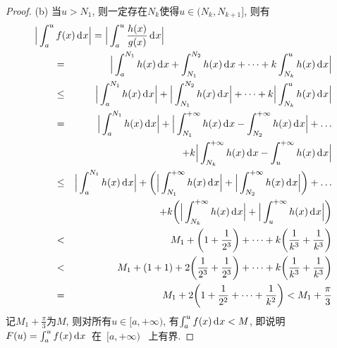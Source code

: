\documentclass[a4paper,12pt,twoside]{ctexart}
\begin{document}
\begin{proof}
    (b) 当$u>N_1$, 则一定存在${N_k}$使得$u\in(N_k, N_{k+1}]$, 则有\setcolsep
\begin{eqnarray*}
    \lefteqn{\Big\vert\int_a^uf(x)\dx\Big\vert
    =\Big\vert\int_{a}^{u}\frac{h(x)}{g(x)}\dx\Big\vert}\qquad\\
    &=&\Big\vert\int_{a}^{N_1}h(x)\dx+ \int_{N_1}^{N_2}h(x)\dx+\dots+k\int_{N_k}^uh(x)\dx\Big\vert\\
    &\le&\Big\vert\int_{a}^{N_1}h(x)\dx\Big\vert +\Big\vert\int_{N_1}^{N_2}h(x)\dx\Big\vert+\dots+ k\Big\vert\int_{N_k}^{u}h(x)\dx\Big\vert\\
    &=&\Big\vert\int_{a}^{N_1}h(x)\dx\Big\vert +\Big\vert\int_{N_1}^{+\infty}h(x)\dx- \int_{N_2}^{+\infty}h(x)\dx\Big\vert+\dots \\&&\quad+k\Big\vert\int_{N_k}^{+\infty}h(x)\dx -\int_{u}^{+\infty}h(x)\dx\Big\vert\\
    &\le&\Big\vert\int_{a}^{N_1}h(x)\dx\Big\vert +\bigg(\Big\vert\int_{N_1}^{+\infty}h(x)\dx\Big\vert +\Big\vert\int_{N_2}^{+\infty}h(x)\dx\Big\vert\bigg)+\dots
    \\ &&\quad+k\bigg(\Big\vert\int_{N_k}^{+\infty}h(x)\dx\Big\vert +\Big\vert\int_{u}^{+\infty}h(x)\dx\Big\vert\bigg)\\
    &<&M_1+\bigg(1+\frac1{2^3}\bigg)+\cdots+k\bigg(\frac1{k^3}+\frac1{k^3}\bigg)\\
    &<&M_1+(1+1)+2\bigg(\frac1{2^3}+\frac1{2^3}\bigg) +\dots+k\bigg(\frac1{k^3}+\frac1{k^3}\bigg)\\
    &=& M_1+2\bigg(1+\frac1{2^2}+\dots+\frac1{k^2}\bigg)< M_1+\frac\pi3
\end{eqnarray*}
记$M_1+\frac\pi3$为$M$, 则对所有$u\in[a, +\infty)$, 有$\int_a^uf(x){\,\textup{d}}^{}x<M$, 即说明~$F(u)=\int_{a}^{u}f(x){\,\textup{d}}^{}x$~在~$[a, +\infty)$~ 上有界.
\end{proof}
\end{document}
